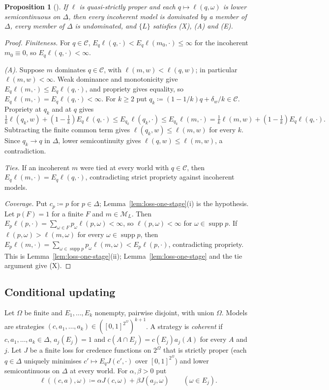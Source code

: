 \documentclass[11pt]{article}
\newtheorem{proposition}[theorem]{Proposition}
\theoremstyle{definition}
\theoremstyle{remark}
\newcommand{\M}{\mathcal M}
\newcommand{\C}{\mathcal C}
\newcommand{\supp}{\operatorname{supp}}
\begin{document}
\begin{proposition}[{\cite{Nielsen2023}}]\label{prop:probabilism}
If $\ell$ is quasi-strictly proper and each $q\mapsto\ell(q,\omega)$ is lower semicontinuous on $\Delta$, then every incoherent model is dominated by a member of $\Delta$, every member of $\Delta$ is undominated, and $\{L\}$ satisfies (X), (A) and (E).
\end{proposition}
\begin{proof}
\emph{Finiteness.} For $q\in\C$, $E_q\ell(q,\cdot)<E_q\ell(m_0,\cdot)\le\infty$ for the incoherent $m_0\equiv0$, so $E_q\ell(q,\cdot)<\infty$.

\emph{(A).} Suppose $m$ dominates $q\in\C$, with $\ell(m,w)<\ell(q,w)$; in particular $\ell(m,w)<\infty$. Weak dominance and monotonicity give $E_q\ell(m,\cdot)\le E_q\ell(q,\cdot)$, and propriety gives equality, so $E_q\ell(m,\cdot)=E_q\ell(q,\cdot)<\infty$. For $k\ge2$ put $q_k\coloneqq(1-1/k)q+\delta_w/k\in\C$. Propriety at $q_k$ and at $q$ gives
\[
\tfrac1k\ell(q_k,w)+(1-\tfrac1k)E_q\ell(q,\cdot)\le E_{q_k}\ell(q_k,\cdot)\le E_{q_k}\ell(m,\cdot)=\tfrac1k\ell(m,w)+(1-\tfrac1k)E_q\ell(q,\cdot).
\]
Subtracting the finite common term gives $\ell(q_k,w)\le\ell(m,w)$ for every $k$. Since $q_k\to q$ in $\Delta$, lower semicontinuity gives $\ell(q,w)\le\ell(m,w)$, a contradiction.

\emph{Ties.} If an incoherent $m$ were tied at every world with $q\in\C$, then $E_q\ell(m,\cdot)=E_q\ell(q,\cdot)$, contradicting strict propriety against incoherent models.

\emph{Coverage.} Put $c_p\coloneqq p$ for $p\in\Delta$; Lemma~\ref{lem:loss-one-stage}(i) is the hypothesis. Let $p(F)=1$ for a finite $F$ and $m\in\M_L$. Then $E_p\ell(p,\cdot)=\sum_{\omega\in F}p_\omega\ell(p,\omega)<\infty$, so $\ell(p,\omega)<\infty$ for $\omega\in\supp p$. If $\ell(p,\omega)>\ell(m,\omega)$ for every $\omega\in\supp p$, then $E_p\ell(m,\cdot)=\sum_{\omega\in\supp p}p_\omega\ell(m,\omega)<E_p\ell(p,\cdot)$, contradicting propriety. This is Lemma~\ref{lem:loss-one-stage}(ii); Lemma~\ref{lem:loss-one-stage} and the tie argument give (X).
\end{proof}

\subsection{Conditional updating}

Let $\Omega$ be finite and $E_1,\dots,E_k$ nonempty, pairwise disjoint, with union $\Omega$. Models are strategies $(c,a_1,\dots,a_k)\in([0,1]^{2^\Omega})^{k+1}$. A strategy is \emph{coherent} if $c,a_1,\dots,a_k\in\Delta$, $a_j(E_j)=1$ and $c(A\cap E_j)=c(E_j)a_j(A)$ for every $A$ and $j$. Let $J$ be a finite loss for credence functions on $2^\Omega$ that is strictly proper (each $q\in\Delta$ uniquely minimises $c'\mapsto E_qJ(c',\cdot)$ over $[0,1]^{2^\Omega}$) and lower semicontinuous on $\Delta$ at every world. For $\alpha,\beta>0$ put
\[
\ell((c,a),\omega)\coloneqq\alpha J(c,\omega)+\beta J(a_j,\omega)\qquad(\omega\in E_j).
\]
\end{document}
